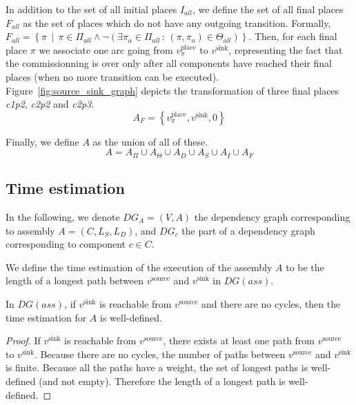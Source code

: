In addition to the set of all initial places $I_{all}$, we define
the set of all final places $F_{all}$ as the set of places which
do not have any outgoing transition. Formally,
$F_{all}=\left\{ \pi\,\mid\,\pi\in\Pi_{all}\land\lnot\left(\exists\pi_{a}\in\Pi_{all}\,:\,\left(\pi,\pi_{a}\right)\in\Theta_{all}\right)\right\} $.
Then, for each final place $\pi$ we associate one arc going from
$v_\pi^\text{place}$ to $v^\text{sink}$, representing the fact that the
commissionning is over only after all components have reached their final places
(\ie when no more transition can be executed).
Figure~\ref{fig:source_sink_graph} depicts the transformation of three final
places \emph{c1p2}, \emph{c2p2} and \emph{c2p3}.
\[
A_{F}=\left\{ v_\pi^\text{place},v^\text{sink},0\right\} 
\]



Finally, we define $A$ as the union of all of these. 
\[
A=A_\Pi\cup A_{\Theta}\cup A_{D}\cup A_{S}\cup A_{I}\cup A_{F}
\]


\subsection{Time estimation}

In the following, we denote $DG_A=(V,A)$ the dependency graph corresponding
to assembly $A=(C,L_S,L_D)$, and $DG_c$ the part of a dependency graph
corresponding to component $c \in C$.

We define the time estimation of the execution of the \mad assembly $A$
to be the length of a longest path between $v^\text{source}$ and
$v^\text{sink}$ in $DG(ass)$.

\begin{lemma}
 In $DG(ass)$, if $v^\text{sink}$ is reachable from $v^\text{source}$ and there
 are no cycles, then the time estimation for $A$ is well-defined.
 \label{lemma:well_defined}
\end{lemma}

\begin{proof}
 If $v^\text{sink}$ is reachable from $v^\text{source}$, there exists at least
 one path from $v^\text{source}$ to  $v^\text{sink}$. Because there are no
 cycles, the number of paths between $v^\text{source}$ and $v^\text{sink}$ is
 finite. Because all the paths have a weight, the set of longest paths is
 well-defined (and not empty). Therefore the length of a longest path is
 well-defined.
\end{proof}


